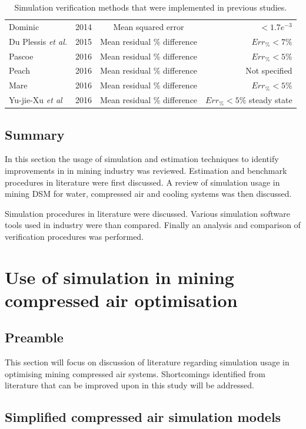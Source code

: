 \begin{table}[h]
\begin{tabular}{p{5cm}ccr}
 			Dominic \cite{dominic2014dynamic}					& 2014 & Mean squared error & $<1.7e^{-3}$	\\
 			Du Plessis \textit{et al.}\cite{du2015development} 	& 2015 & Mean residual \% difference & $Err_{\%} <7\%$ \\
 			Pascoe \cite{Pascoe2016Masters} 					& 2016 & Mean residual \% difference & $Err_{\%} <5\%$ \\	
			Peach \cite{Peach2016Masters}						& 2016 & Mean residual \% difference & Not specified\\
 			Mare \cite{Mare2016PhD} 							& 2016 & Mean residual \% difference & $Err_{\%} <5\%$  \\	
 			Yu-jie-Xu \textit{et al} \cite{xu2016modeling}		& 2016 & Mean residual \% difference & $Err_{\%} <5\%$ steady state \\
 			\hline
 		\end{tabular} 
 		\caption{Simulation verification methods that were implemented in previous studies.}
 		\label{table: Verification studies}
 	\end{table}
 	\subsection{Summary}
 	In this section the usage of simulation and estimation techniques to identify improvements in in mining industry was reviewed. Estimation and benchmark procedures in literature were first discussed. A review of simulation usage in mining DSM for water, compressed air and cooling systems was then discussed. 
 	\par 
 	Simulation procedures in literature were discussed. Various simulation software tools used in industry were than compared. Finally an analysis and comparison of verification procedures was performed.
 	
\section{Use of simulation in mining compressed air optimisation}
\label{CompressorSimulation Literature}
\subsection{Preamble}
This section will focus on discussion of literature regarding simulation usage in optimising mining compressed air systems. Shortcomings identified from literature that can be improved upon in this study will be addressed.
\subsection{Simplified compressed air simulation models} \label{simplfiedModels}
